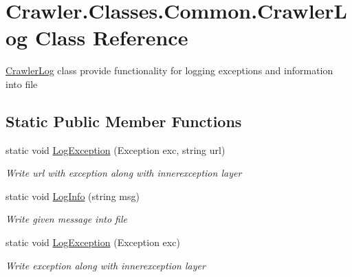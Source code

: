 \hypertarget{class_crawler_1_1_classes_1_1_common_1_1_crawler_log}{\section{Crawler.\-Classes.\-Common.\-Crawler\-Log Class Reference}
\label{class_crawler_1_1_classes_1_1_common_1_1_crawler_log}
}


\hyperlink{class_crawler_1_1_classes_1_1_common_1_1_crawler_log}{Crawler\-Log} class provide functionality for logging exceptions and information into file  


\subsection*{Static Public Member Functions}
\begin{DoxyCompactItemize}
\item 
static void \hyperlink{class_crawler_1_1_classes_1_1_common_1_1_crawler_log_a3ac044e747e7a44b9e023f8304545a7c}{Log\-Exception} (Exception exc, string url)
\begin{DoxyCompactList}\small\item\em Write url with exception along with innerexception layer \end{DoxyCompactList}\item 
static void \hyperlink{class_crawler_1_1_classes_1_1_common_1_1_crawler_log_a876edcb45aefe7798c013d9ac5a54e3f}{Log\-Info} (string msg)
\begin{DoxyCompactList}\small\item\em Write given message into file \end{DoxyCompactList}\item 
static void \hyperlink{class_crawler_1_1_classes_1_1_common_1_1_crawler_log_a3a95dd89bed42a2e73477545c896bff1}{Log\-Exception} (Exception exc)
\begin{DoxyCompactList}\small\item\em Write exception along with innerexception layer \end{DoxyCompactList}\end{DoxyCompactItemize}
